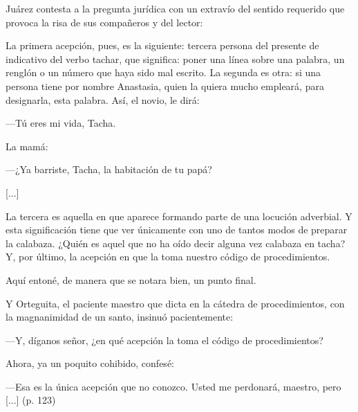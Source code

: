 \documentclass[14pt,twoside,final]{extbook} %
\begin{document}
Juárez contesta a la pregunta jurídica con un extravío del sentido requerido que provoca la risa de sus compañeros y del lector:
\begin{quoting}
La primera acepción, pues, es la siguiente: tercera persona del presente de indicativo del verbo tachar, que significa: poner una línea sobre una palabra, un renglón o un número que haya sido mal
escrito. La segunda es otra: si una persona tiene por nombre Anastasia, quien la quiera mucho empleará, para designarla, esta palabra. Así, el novio, le dirá:

---Tú eres mi vida, Tacha.

La mamá:

---¿Ya barriste, Tacha, la habitación de tu papá?

\centerline{[...]}

La tercera es aquella en que aparece formando parte de una locución adverbial. Y esta significación tiene que ver únicamente con uno de tantos modos de preparar la calabaza. ¿Quién es aquel que no ha oído decir alguna vez calabaza en tacha? Y, por último, la acepción en que la toma nuestro código de procedimientos.

Aquí entoné, de manera que se notara bien, un punto final.

Y Orteguita, el paciente maestro que dicta en la cátedra de procedimientos, con la magnanimidad de un santo, insinuó pacientemente:

---Y, díganos señor, ¿en qué acepción la toma el código de procedimientos?

Ahora, ya un poquito cohibido, confesé:

---Esa es la única acepción que no conozco. Usted me perdonará, maestro, pero [...] (p. 123)
\end{quoting}
\end{document}
